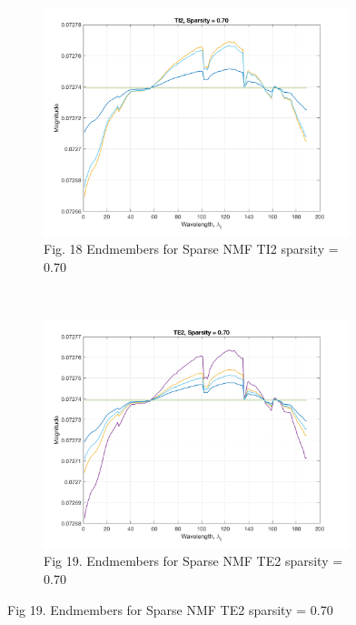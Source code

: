\documentclass[journal]{IEEEtran}
\begin{document}
\begin{figure}[!t]
    \captionsetup[subfigure]{labelformat=empty}
    \begin{subfigure}[t]{0.5\textwidth}
    \centering
    \includegraphics[width=3.5in]{nmf_endmembers_ti2_70.png}
    \caption{Fig. 18 Endmembers for Sparse NMF TI2 sparsity = 0.70}
    \label{fig:nmf_end_ti2_70}
    \end{subfigure}
~
    \begin{subfigure}[t]{0.5\textwidth}
    \centering
    \includegraphics[width=3.5in]{nmf_endmembers_te2_70.png}
    \caption{Fig 19. Endmembers for Sparse NMF TE2 sparsity = 0.70}
    \label{fig:nmf_end_te2_70}
    \end{subfigure}


\end{figure}
\end{document}
